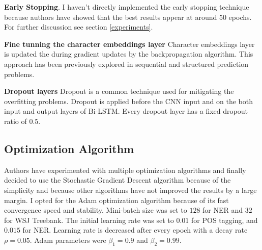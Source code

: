 \textbf{Early Stopping}. I haven't directly implemented the early stopping
technique\cite{earlystop} because authors have showed that the best results
appear at around $50$ epochs. For further discussion see section
\ref{experiments}.

\textbf{Fine tunning the character embeddings layer}
Character embeddings layer is updated the during gradient updates by the
backpropagation algorithm. This approach has been previously explored in
sequential and structured prediction problems\cite{finetune}.

\textbf{Dropout layers}
Dropout is a common technique used for mitigating the overfitting problems.
Dropout is applied before the CNN input and on the both input and output
layers of Bi-LSTM. Every dropout layer has a fixed dropout ratio of $0.5$.

\subsection{Optimization Algorithm}
Authors have experimented with multiple optimization algorithms and finally
decided to use the Stochastic Gradient Descent\cite{SGD} algorithm because of
the simplicity and because other algorithms have not improved the results by a
large margin. I opted for the Adam optimization algorithm\cite{adam} because of
its fast convergence speed and stability. Mini-batch size was set to $128$ for
NER and $32$ for WSJ Treebank. The initial learning rate was set to $0.01$ for
POS tagging, and $0.015$ for NER. Learning rate is decreased after every epoch
with a decay rate $\rho = 0.05$. Adam parameters were $\beta_1 = 0.9$ and
$\beta_2 = 0.99$.

